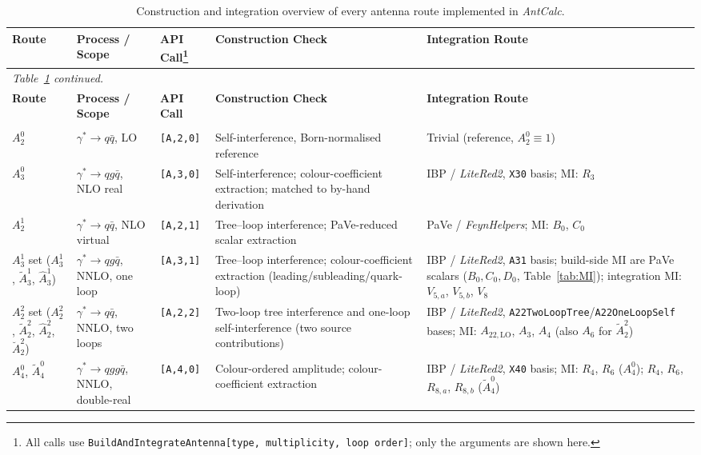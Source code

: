 \footnotesize
\renewcommand{\arraystretch}{1.15}
\begin{center}
\begin{longtable}{|p{1.9cm}|>{\raggedright\arraybackslash}p{2.3cm}|p{2.1cm}|p{3.0cm}|p{3.4cm}|}
\hline
\textbf{Route} & \textbf{Process / Scope} & \textbf{API Call\footnote{All calls use \texttt{BuildAndIntegrateAntenna[type, multiplicity, loop order]}; only the arguments are shown here.}} & \textbf{Construction Check} & \textbf{Integration Route} \\
\hline
\endfirsthead
\multicolumn{5}{l}{\textit{Table~\ref{tab:masterValidationConstruction} continued.}}\\
\hline
\textbf{Route} & \textbf{Process / Scope} & \textbf{API Call} & \textbf{Construction Check} & \textbf{Integration Route} \\
\hline
\endhead
\hline
\caption{Construction and integration overview of every antenna route implemented in \textit{AntCalc}.}
\label{tab:masterValidationConstruction}\\
\endlastfoot
$A_2^0$ & $\gamma^*\to q\bar q$, LO & \texttt{[A,2,0]} & Self-interference, Born-normalised reference & Trivial (reference, $A_2^0\equiv1$) \\ \hline
$A_3^0$ & $\gamma^*\to qg\bar q$, NLO real & \texttt{[A,3,0]} & Self-interference; colour-coefficient extraction; matched to by-hand derivation & IBP / \textit{LiteRed2}, \texttt{X30} basis; MI: $R_3$ \\ \hline
$A_2^1$ & $\gamma^*\to q\bar q$, NLO virtual & \texttt{[A,2,1]} & Tree--loop interference; PaVe-reduced scalar extraction & PaVe / \textit{FeynHelpers}; MI: $B_0$, $C_0$ \\ \hline
$A_3^1$ set ($A_3^1$, $\tilde A_3^1$, $\hat A_3^1$) & $\gamma^*\to qg\bar q$, NNLO, one loop & \texttt{[A,3,1]} & Tree--loop interference; colour-coefficient extraction (leading/subleading/quark-loop) & IBP / \textit{LiteRed2}, \texttt{A31} basis; build-side MI are PaVe scalars ($B_0,C_0,D_0$, Table~\ref{tab:MI}); integration MI: $V_{5,a}$, $V_{5,b}$, $V_8$ \\ \hline
$A_2^2$ set ($A_2^2$, $\tilde A_2^2$, $\hat A_2^2$, $\breve A_2^2$) & $\gamma^*\to q\bar q$, NNLO, two loops & \texttt{[A,2,2]} & Two-loop tree interference and one-loop self-interference (two source contributions) & IBP / \textit{LiteRed2}, \texttt{A22TwoLoopTree}/\allowbreak\texttt{A22OneLoopSelf} bases; MI: $A_{22,\text{LO}}$, $A_3$, $A_4$ (also $A_6$ for $\tilde A_2^2$) \\ \hline
$A_4^0$, $\tilde A_4^0$ & $\gamma^*\to qgg\bar q$, NNLO, double-real & \texttt{[A,4,0]} & Colour-ordered amplitude; colour-coefficient extraction & IBP / \textit{LiteRed2}, \texttt{X40} basis; MI: $R_4$, $R_6$ ($A_4^0$); $R_4$, $R_6$, $R_{8,a}$, $R_{8,b}$ ($\tilde A_4^0$) \\ \hline

\end{longtable}
\end{center}
